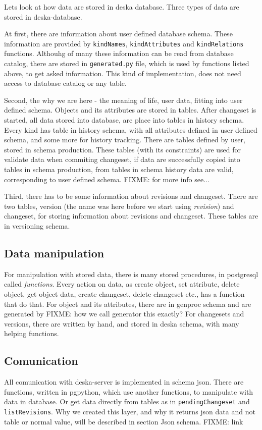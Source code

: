 \documentclass[deska]{subfiles}
\begin{document}
Lets look at how data are stored in deska database. Three types of data are stored in deska-database.

At first, there are information
about user defined database schema. These information are provided by {\tt kindNames}, {\tt kindAttributes} and {\tt kindRelations} functions.
Althouhg of many these information can be read from database catalog, there are stored in {\tt generated.py} file, which is used by
functions listed above, to get asked information. This kind of implementation, does not need access to database catalog or any table.

Second, the why we are here - the meaning of life, user data, fitting into user defined schema.
Objects and its attributes are stored in tables. 
After changeset is started, all data stored into database, are place into tables in history schema. Every kind has table in history
schema, with all attributes defined in user defined schema, and some more for history tracking.
There are tables defined by user, stored in schema production. These tables
(with its constraints) are used for validate data when commiting changeset, if data are successfully copied into tables in schema production,
from tables in schema history data are valid, corresponding to user defined schema.
FIXME: for more info see...

Third, there has to be some information about revisions and changeset. There are two tables, version (the name was here before
we start using {\em revision}) and changeset, for storing information about revisions and changeset. These tables are
in versioning schema.

\subsection{Data manipulation}
For manipulation with stored data, there is many stored procedures, in postgresql called {\em functions}.
Every action on data, as create object, set attribute, delete object, get object data, create changeset, delete changeset etc.,
has a function that do that. For object and its attributes, there are in genproc schema and are generated by
FIXME: how we call generator this exactly?
For changesets and versions, there are written by hand, and stored in deska schema, with many helping functions.

\subsection{Comunication}
All comunication with deska-server is implemented in schema json. There are functions, written in pgpython, which use another
functions, to manipulate with data in database. Or get data directly from tables as in {\tt pendingChangeset} and {\tt listRevisions}.
Why we created this layer, and why it returns json data and not table or normal value, will be described in section Json schema.
FIXME: link
\end{document}
